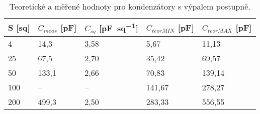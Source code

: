\begin{table}[h!]
    \caption{Teoretické a měřené hodnoty pro kondenzátory s výpalem postupně.}
    \centering
    \def\arraystretch{1.4}
    \begin{tabular}{l|l|l||l|l}
        S [sq] & \(C_{meas} \) [\unit{\pico\farad}] & \(C_{sq} \) [\unit{\pico\farad\per sq}]  & \(C_{teor MIN}\) [\unit{\pico\farad}] & \(C_{teor MAX}\) [\unit{\pico\farad}]\\ \hline
        4       & 14,3  & 3,58  & 5,67       & 11,13   \\ \hline
        25      & 67,5  & 2,70  & 35,42      & 69,57   \\ \hline
        50      & 133,1 & 2,66  & 70,83      & 139,14  \\ \hline
        100     & --    & --    & 141,67     & 278,27  \\ \hline
        200     & 499,3 & 2,50  & 283,33     & 556,55  \\ 

        \end{tabular}
    \label{tab:c_postupne_hodnoty}
\end{table}
